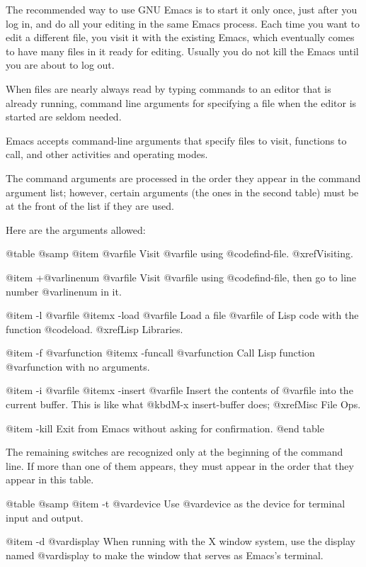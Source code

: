 {{{  The recommended way to use GNU Emacs is to start it only once, just after
you log in, and do all your editing in the same Emacs process.  Each time
you want to edit a different file, you visit it with the existing Emacs,
which eventually comes to have many files in it ready for editing.  Usually
you do not kill the Emacs until you are about to log out.

  When files are nearly always read by typing commands to an editor that is
already running, command line arguments for specifying a file when the
editor is started are seldom needed.

  Emacs accepts command-line arguments that specify files to visit,
functions to call, and other activities and operating modes.

  The command arguments are processed in the order they appear in the
command argument list; however, certain arguments (the ones in the second
table) must be at the front of the list if they are used.

  Here are the arguments allowed:

@table @samp
@item @var{file}
Visit @var{file} using @code{find-file}.  @xref{Visiting}.

@item +@var{linenum} @var{file}
Visit @var{file} using @code{find-file}, then go to line number
@var{linenum} in it.

@item -l @var{file}
@itemx -load @var{file}
Load a file @var{file} of Lisp code with the function @code{load}.
@xref{Lisp Libraries}.

@item -f @var{function}
@itemx -funcall @var{function}
Call Lisp function @var{function} with no arguments.

@item -i @var{file}
@itemx -insert @var{file}
Insert the contents of @var{file} into the current buffer.
This is like what @kbd{M-x insert-buffer} does; @xref{Misc File Ops}.

@item -kill
Exit from Emacs without asking for confirmation.
@end table

  The remaining switches are recognized only at the beginning of the
command line.  If more than one of them appears, they must appear in the
order that they appear in this table.

@table @samp
@item -t @var{device}
Use @var{device} as the device for terminal input and output.

@item -d @var{display}
When running with the X window system, use the display named @var{display}
to make the window that serves as Emacs's terminal.

}}}
